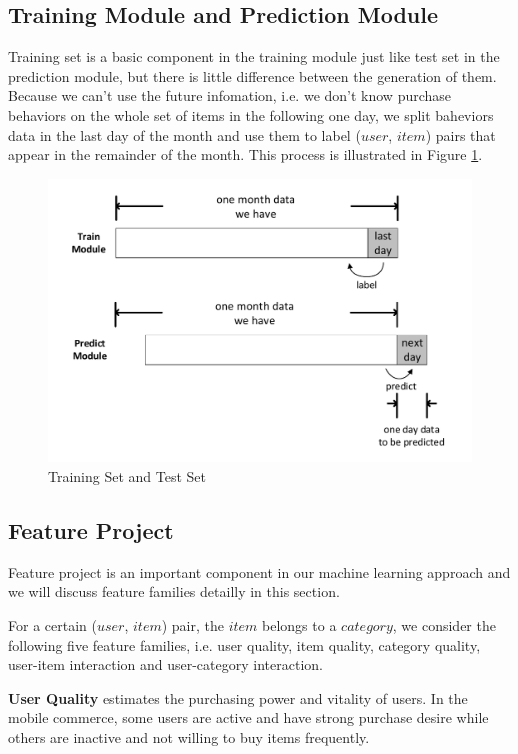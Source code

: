 \documentclass{llncs}
\begin{document}
\subsection{Training Module and Prediction Module}
Training set is a basic component in the training module just like
test set in the prediction module,
but there is little difference between the generation of them.
Because we can't use the future infomation,
i.e. we don't know purchase behaviors
on the whole set of items in the following one day,
we split baheviors data in the last day of the month
and use them to label ($user$, $item$) pairs that appear
in the remainder of the month.
This process is illustrated in Figure \ref{fig:train_and_test}.

\begin{figure}[htbp]
	\centering
	\includegraphics[scale=0.4]{images/train_and_test.pdf}
	\caption{Training Set and Test Set}
	\label{fig:train_and_test}
\end{figure}

\subsection{Feature Project}
Feature project is an important component in our machine learning approach
and we will discuss feature families detailly in this section.

For a certain ($user$, $item$) pair, the $item$ belongs to a $category$,
we consider the following five feature families,
i.e. user quality, item quality, category quality, user-item interaction
and user-category interaction.

\textbf{User Quality} estimates the purchasing power and vitality of users.
In the mobile commerce, some users are active and have strong purchase desire
while others are inactive and not willing to buy items frequently.
\end{document}
